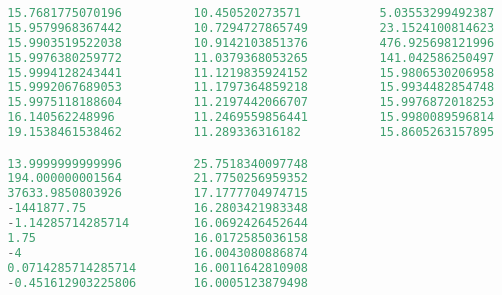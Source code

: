 \begin{lstlisting}[language = MATLAB]
%%%% Problem 3, Convergence Rate
  15.7681775070196          10.450520273571           5.03553299492387
  15.9579968367442          10.7294727865749          23.1524100814623
  15.9903519522038          10.9142103851376          476.925698121996
  15.9976380259772          11.0379368053265          141.042586250497
  15.9994128243441          11.1219835924152          15.9806530206958
  15.9992067689053          11.1797364859218          15.9934482854748
  15.9975118188604          11.2197442066707          15.9976872018253
  16.140562248996           11.2469559856441          15.9980089596814
  19.1538461538462          11.289336316182           15.8605263157895

  13.9999999999996          25.7518340097748
  194.000000001564          21.7750256959352
  37633.9850803926          17.1777704974715
  -1441877.75               16.2803421983348
  -1.14285714285714         16.0692426452644
  1.75                      16.0172585036158
  -4                        16.0043080886874
  0.0714285714285714        16.0011642810908
  -0.451612903225806        16.0005123879498
\end{lstlisting}





